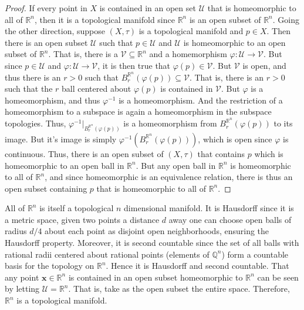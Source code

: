         \begin{proof}
            If every point in $X$ is contained in an open set $\mathcal{U}$ that
            is homeomorphic to all of $\mathbb{R}^{n}$, then it is a topological
            manifold since $\mathbb{R}^{n}$ is an open subset of
            $\mathbb{R}^{n}$. Going the other direction, suppose $(X,\tau)$ is a
            topological manifold and $p\in{X}$. Then there is an open subset
            $\mathcal{U}$ such that $p\in\mathcal{U}$ and $\mathcal{U}$ is
            homeomorphic to an open subset of $\mathbb{R}^{n}$. That is, there
            is a $\mathcal{V}\subseteq\mathbb{R}^{n}$ and a homemorphism
            $\varphi:\mathcal{U}\rightarrow\mathcal{V}$. But since
            $p\in\mathcal{U}$ and $\varphi:\mathcal{U}\rightarrow\mathcal{V}$,
            it is then true that $\varphi(p)\in\mathcal{V}$. But $\mathcal{V}$
            is open, and thus there is an $r>0$ such that
            $B_{r}^{\mathbb{R}^{n}}(\varphi(p))\subseteq\mathcal{V}$. That is,
            there is an $r>0$ such that the $r$ ball centered about $\varphi(p)$
            is contained in $\mathcal{V}$. But $\varphi$ is a homeomorphism, and
            thus $\varphi^{\minus{1}}$ is a homeomorphism. And the restriction
            of a homeomorphism to a subspace is again a homeomorphism in the
            subspace topologies. Thus,
            $\varphi^{\minus{1}}|_{B_{r}^{\mathbb{R}^{n}}(\varphi(p))}$ is a
            homeomorphism from $B_{r}^{\mathbb{R}^{n}}(\varphi(p))$ to its
            image. But it's image is simply
            $\varphi^{\minus{1}}(B_{r}^{\mathbb{R}^{n}}(\varphi(p)))$, which is
            open since $\varphi$ is continuous. Thus, there is an open subset of
            $(X,\tau)$ that contains $p$ which is homeomorphic to an open ball
            in $\mathbb{R}^{n}$. But any open ball in $\mathbb{R}^{n}$ is
            homeomorphic to all of $\mathbb{R}^{n}$, and since homeomorphic is
            an equivalence relation, there is thus an open subset containing $p$
            that is homeomorphic to all of $\mathbb{R}^{n}$.
        \end{proof}
        \begin{example}
            All of $\mathbb{R}^{n}$ is itself a topological $n$ dimensional
            manifold. It is Hausdorff since it is a metric space, given two
            points a distance $d$ away one can choose open balls of radius
            $d/4$ about each point as disjoint open neighborhoods, ensuring the
            Hausdorff property. Moreover, it is second countable since the set
            of all balls with rational radii centered about rational points
            (elements of $\mathbb{Q}^{n}$) form a countable basis for the
            topology on $\mathbb{R}^{n}$. Hence it is Hausdorff and second
            countable. That any point $\mathbf{x}\in\mathbb{R}^{n}$ is contained
            in an open subset homeomorphic to $\mathbb{R}^{n}$ can be seen by
            letting $\mathcal{U}=\mathbb{R}^{n}$. That is, take as the open
            subset the entire space. Therefore, $\mathbb{R}^{n}$ is a
            topological manifold.
        \end{example}
